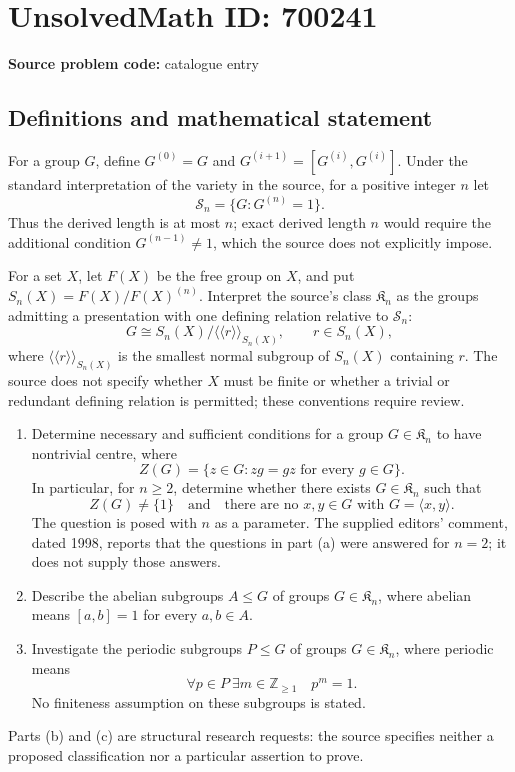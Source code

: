 \documentclass[11pt]{article}
\newcommand{\Z}{\mathbb{Z}}
\begin{document}
\section*{UnsolvedMath ID: 700241}
\textbf{Source problem code:} catalogue entry
\subsection{Definitions and mathematical statement}
For a group \(G\), define \(G^{(0)}=G\) and \(G^{(i+1)}=[G^{(i)},G^{(i)}]\). Under the standard interpretation of the variety in the source, for a positive integer \(n\) let
\[
\mathcal S_n=\{G:G^{(n)}=1\}.
\]
Thus the derived length is at most \(n\); exact derived length \(n\) would require the additional condition \(G^{(n-1)}\ne1\), which the source does not explicitly impose.

For a set \(X\), let \(F(X)\) be the free group on \(X\), and put \(S_n(X)=F(X)/F(X)^{(n)}\). Interpret the source's class \(\mathfrak K_n\) as the groups admitting a presentation with one defining relation relative to \(\mathcal S_n\):
\[
G\cong S_n(X)/\langle\!\langle r\rangle\!\rangle_{S_n(X)},\qquad r\in S_n(X),
\]
where \(\langle\!\langle r\rangle\!\rangle_{S_n(X)}\) is the smallest normal subgroup of \(S_n(X)\) containing \(r\). The source does not specify whether \(X\) must be finite or whether a trivial or redundant defining relation is permitted; these conventions require review.

\begin{enumerate}
\item[(a)] Determine necessary and sufficient conditions for a group \(G\in\mathfrak K_n\) to have nontrivial centre, where
\[
Z(G)=\{z\in G:zg=gz\text{ for every }g\in G\}.
\]
In particular, for \(n\ge2\), determine whether there exists \(G\in\mathfrak K_n\) such that
\[
Z(G)\ne\{1\}
\quad\text{and}\quad
\text{there are no }x,y\in G\text{ with }G=\langle x,y\rangle.
\]
The question is posed with \(n\) as a parameter. The supplied editors' comment, dated 1998, reports that the questions in part (a) were answered for \(n=2\); it does not supply those answers.
\item[(b)] Describe the abelian subgroups \(A\le G\) of groups \(G\in\mathfrak K_n\), where abelian means \([a,b]=1\) for every \(a,b\in A\).
\item[(c)] Investigate the periodic subgroups \(P\le G\) of groups \(G\in\mathfrak K_n\), where periodic means
\[
\forall p\in P\ \exists m\in\Z_{\ge1}\quad p^m=1.
\]
No finiteness assumption on these subgroups is stated.
\end{enumerate}
Parts (b) and (c) are structural research requests: the source specifies neither a proposed classification nor a particular assertion to prove.
\end{document}
